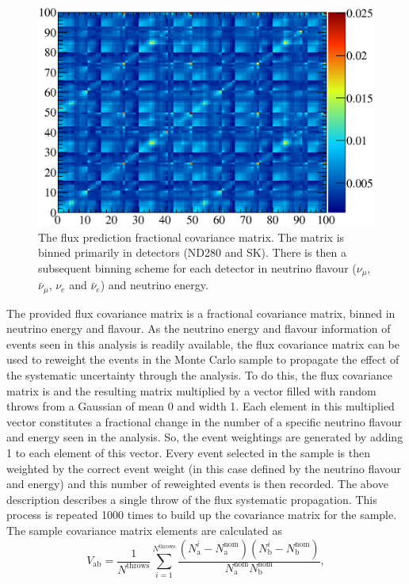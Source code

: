 \begin{figure}
  \centering
  \includegraphics[width=12cm]{images/measurement/systematics/flux/flux_prediction_syst.eps}
  \caption{The flux prediction fractional covariance matrix.  The matrix is binned primarily in detectors (ND280 and SK).  There is then a subsequent binning scheme for each detector in neutrino flavour ($\nu_\mu$, $\bar{\nu}_\mu$, $\nu_e$ and $\bar{\nu}_e$) and neutrino energy.}
  \label{fig:FluxPredictionSyst}
\end{figure}
The provided flux covariance matrix is a fractional covariance matrix, binned in neutrino energy and flavour.  As the neutrino energy and flavour information of events seen in this analysis is readily available, the flux covariance matrix can be used to reweight the events in the Monte Carlo sample to propagate the effect of the systematic uncertainty through the analysis.  To do this, the flux covariance matrix is  and the resulting matrix multiplied by a vector filled with random throws from a Gaussian of mean 0 and width 1.  Each element in this multiplied vector constitutes a fractional change in the number of a specific neutrino flavour and energy seen in the analysis.  So, the event weightings are generated by adding 1 to each element of this vector.  Every event selected in the sample is then weighted by the correct event weight (in this case defined by the neutrino flavour and energy) and this number of reweighted events is then recorded.  The above description describes a single throw of the flux systematic propagation.  This process is repeated 1000 times to build up the covariance matrix for the sample.  The sample covariance matrix elements are calculated as
\begin{equation}
  V_{\textrm{ab}} = \frac{1}{N^{\textrm{throws}}}\sum^{N^{\textrm{throws}}}_{i=1}\frac{\left(N_{\textrm{a}}^{i} - N_{\textrm{a}}^{\textrm{nom}}\right)\left(N_{\textrm{b}}^{i} - N_{\textrm{b}}^{\textrm{nom}}\right)}{N_{\textrm{a}}^{\textrm{nom}}N_{\textrm{b}}^{\textrm{nom}}},
  \label{eqn:CovarianceMatrixElementDef}
\end{equation}
